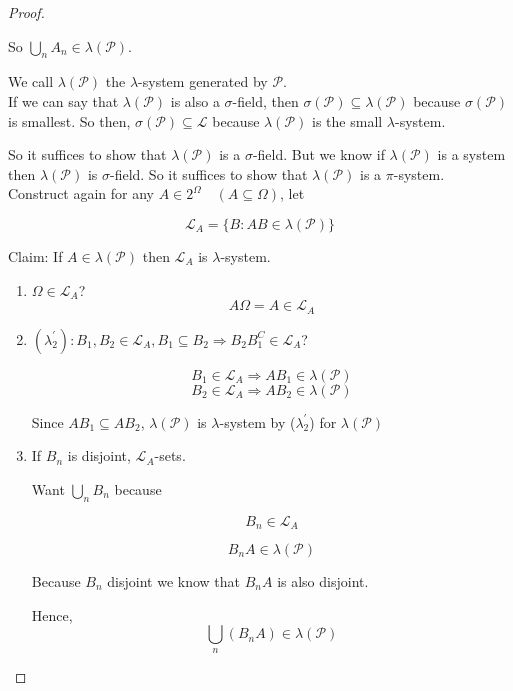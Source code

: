 \documentclass[11pt,fleqn]{book} %
\begin{document}
\begin{proof}
\begin{enumerate}
		So $\bigcup_n A_n \in \lambda(\mathcal{P})$. 

		We call $\lambda(\mathcal{P})$ the $\lambda$-system generated by $\mathcal{P}$.\\

		If we can say that $\lambda(\mathcal{P})$ is also a $\sigma$-field, then $\sigma(\mathcal{P}) \subseteq \lambda(\mathcal{P})$ because $\sigma(\mathcal{P})$ is smallest. So then, $\sigma(\mathcal{P}) \subseteq \mathcal{L}$ because $\lambda(\mathcal{P})$ is the small $\lambda$-system. 

		So it suffices to show that $\lambda(\mathcal{P})$ is a $\sigma$-field. But we know if $\lambda(\mathcal{P})$ is a system then $\lambda(\mathcal{P})$ is $\sigma$-field. So it suffices to show that $\lambda(\mathcal{P})$ is a $\pi$-system.  \\

		Construct again for any $A \in 2^\Omega \quad (A \subseteq \Omega)$, let

		$$\mathcal{L}_A = \{B: AB \in \lambda(\mathcal{P}) \}$$

		Claim: If $A \in \lambda(\mathcal{P})$ then $\mathcal{L}_A$ is $\lambda$-system.\\

		\begin{enumerate}
			\item $\Omega \in \mathcal{L}_A$? 
				$$A\Omega = A \in \mathcal{L}_A$$
			\item $(\lambda_2^\prime) : B_1, B_2 \in \mathcal{L}_A, B_1 \subseteq  B_2 \Rightarrow B_2B_1^C \in \mathcal{L}_A $?

			$$B_1 \in \mathcal{L}_A \Rightarrow AB_1 \in \lambda(\mathcal{P}) $$
			$$B_2 \in \mathcal{L}_A \Rightarrow AB_2 \in \lambda(\mathcal{P}) $$

			Since $AB_1 \subseteq AB_2$, $\lambda(\mathcal{P})$ is $\lambda$-system by ($\lambda_2^\prime$) for $\lambda(\mathcal{P})$


			\item If $B_n$ is disjoint, $\mathcal{L}_A$-sets. 

			Want $\bigcup_n B_n$ because 

			$$B_n \in \mathcal{L}_A $$

			$$B_n A \in \lambda(\mathcal{P}) $$

			Because $B_n$ disjoint we know that $B_n A$ is also disjoint.

			Hence, 
			$$\bigcup_n(B_n A) \in \lambda(\mathcal{P})$$



\end{enumerate}
\end{enumerate}
\end{proof}
\end{document}
